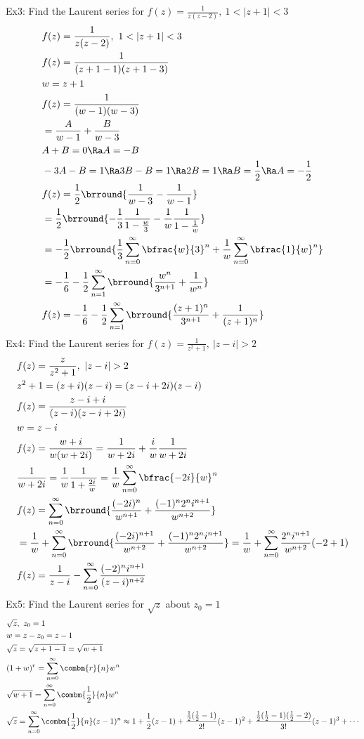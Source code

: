 Ex3: Find the Laurent series for $f(z)=\frac{1}{z(z-2)},\ 1<|z+1|<3$
\begin{align*}
    &f(z)=\frac{1}{z(z-2)},\ 1<|z+1|<3\\
    &f(z)=\frac{1}{(z+1-1)(z+1-3)}\\
    &w=z+1\\
    &f(z)=\frac{1}{(w-1)(w-3)}\\
    &=\frac{A}{w-1}+\frac{B}{w-3}\\
    &A+B=0\Ra A=-B\\
    &-3A-B=1\Ra 3B-B=1\Ra 2B=1\Ra B=\frac{1}{2}\Ra A=-\frac{1}{2}\\
    &f(z)=\frac{1}{2}\brround{\frac{1}{w-3}-\frac{1}{w-1}}\\
    &=\frac{1}{2}\brround{-\frac{1}{3}\frac{1}{1-\frac{w}{3}}-\frac{1}{w}\frac{1}{1-\frac{1}{w}}}\\
    &=-\frac{1}{2}\brround{\frac{1}{3}\sum_{n=0}^\infty\bfrac{w}{3}^n+\frac{1}{w}\sum_{n=0}^\infty\bfrac{1}{w}^n}\\
    &=-\frac{1}{6}-\frac{1}{2}\sum_{n=1}^\infty\brround{\frac{w^n}{3^{n+1}}+\frac{1}{w^n}}\\
    &f(z)=-\frac{1}{6}-\frac{1}{2}\sum_{n=1}^\infty\brround{\frac{(z+1)^n}{3^{n+1}}+\frac{1}{(z+1)^n}}
\end{align*}
Ex4: Find the Laurent series for $f(z)=\frac{1}{z^2+1},\ |z-i|>2$
\begin{align*}
    &f(z)=\frac{z}{z^2+1},\ |z-i|>2\\
    &z^2+1=(z+i)(z-i)=(z-i+2i)(z-i)\\
    &f(z)=\frac{z-i+i}{(z-i)(z-i+2i)}\\
    &w=z-i\\
    &f(z)=\frac{w+i}{w(w+2i)}=\frac{1}{w+2i}+\frac{i}{w}\frac{1}{w+2i}\\
    &\frac{1}{w+2i}=\frac{1}{w}\frac{1}{1+\frac{2i}{w}}=\frac{1}{w}\sum_{n=0}^\infty\bfrac{-2i}{w}^n\\
    &f(z)=\sum_{n=0}^\infty\brround{\frac{(-2i)^n}{w^{n+1}}+\frac{(-1)^n2^ni^{n+1}}{w^{n+2}}}\\
    &=\frac{1}{w}+\sum_{n=0}^\infty\brround{\frac{(-2i)^{n+1}}{w^{n+2}}+\frac{(-1)^n2^ni^{n+1}}{w^{n+2}}}=\frac{1}{w}+\sum_{n=0}^\infty\frac{2^ni^{n+1}}{w^{n+2}}(-2+1)\\
    &f(z)=\frac{1}{z-i}-\sum_{n=0}^\infty\frac{(-2)^ni^{n+1}}{(z-i)^{n+2}}
\end{align*}
Ex5: Find the Laurent series for $\sqrt{z}$ about $z_0=1$
\begin{align*}
    &\sqrt{z},\ z_0=1\\
    &w=z-z_0=z-1\\
    &\sqrt{z}=\sqrt{z+1-1}=\sqrt{w+1}\\
    &(1+w)^r=\sum_{n=0}^\infty\combm{r}{n}w^n\\
    &\sqrt{w+1}=\sum_{n=0}^\infty\combm{\frac{1}{2}}{n}w^n\\
    &\sqrt{z}=\sum_{n=0}^\infty\combm{\frac{1}{2}}{n}(z-1)^n\approx 1+\frac{1}{2}(z-1)+\frac{\frac{1}{2}(\frac{1}{2}-1)}{2!}(z-1)^2+\frac{\frac{1}{2}(\frac{1}{2}-1)(\frac{1}{2}-2)}{3!}(z-1)^3+\cdots
\end{align*}
